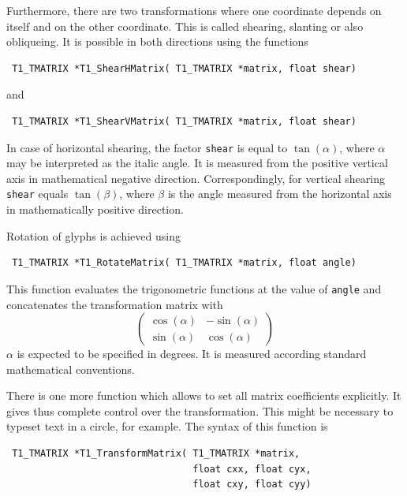 Furthermore, there are two transformations where one coordinate depends on
itself and on the other coordinate.  This is called shearing, slanting or also
obliqueing. It is possible in both directions using the functions 
\precorr
\begin{verbatim}
 T1_TMATRIX *T1_ShearHMatrix( T1_TMATRIX *matrix, float shear)
\end{verbatim}\postcorr
and
\precorr
\begin{verbatim}
 T1_TMATRIX *T1_ShearVMatrix( T1_TMATRIX *matrix, float shear)
\end{verbatim}\postcorr
In case of horizontal shearing, the factor \verb+shear+ is equal to
$\tan(\alpha)$, where $\alpha$ may be interpreted as the italic angle. It is
measured from the positive vertical axis in mathematical negative direction. 
Correspondingly, for vertical shearing \verb+shear+ equals $\tan(\beta)$,
where $\beta$ is the angle measured from the horizontal axis in mathematically
positive direction.

Rotation of glyphs is achieved using 
\precorr
\begin{verbatim}
 T1_TMATRIX *T1_RotateMatrix( T1_TMATRIX *matrix, float angle)
\end{verbatim}\postcorr
This function evaluates the trigonometric functions at the value of
\verb+angle+ and concatenates the transformation matrix with 
\begin{displaymath}
\left( 
\begin{array}{cc}
\cos(\alpha)  & -\sin(\alpha) \\
\sin(\alpha) & \cos(\alpha)
\end{array}
\right)
\end{displaymath}
$\alpha$ is expected to be specified in degrees. It is measured according
standard mathematical conventions.

There is one more function which allows to set all matrix coefficients
explicitly. It gives thus complete control over the transformation. This might
be necessary to typeset text in a circle, for example. The syntax of this
function is
\precorr
\begin{verbatim}
 T1_TMATRIX *T1_TransformMatrix( T1_TMATRIX *matrix, 
                                 float cxx, float cyx,
                                 float cxy, float cyy)
\end{verbatim}\postcorr


